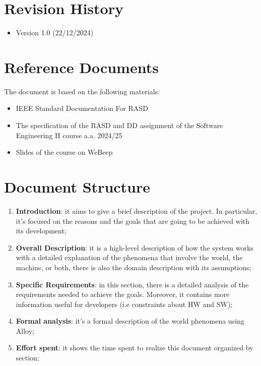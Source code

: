   
\section{Revision History}

\begin{itemize}
    \item Version 1.0 (22/12/2024)
\end{itemize}

\section{Reference Documents}

The document is based on the following materials:

\begin{itemize}
    \item IEEE Standard Documentation For RASD
    \item The specification of the RASD and DD assignment of the Software Engineering II course a.a. 2024/25 
    \item Slides of the course on WeBeep
\end{itemize}

\pagebreak
\section{Document Structure}

\begin{enumerate}
    \item  \textbf{Introduction}: it aims to give a brief description of the project. In particular, it’s focused on the reasons and the goals that are going to be achieved with its development;
 
    \item \textbf{Overall Description}: it is a high-level description of how the system works with a detailed explanation of the phenomena that involve the world, the machine, or both, there is also the domain description with its assumptions;
 
    \item \textbf{Specific Requirements}: in this section, there is a detailed analysis of the requirements needed to achieve the goals. Moreover, it contains more information useful for developers (i.e constraints about HW and SW);
    
    \item \textbf{Formal analysis}: it’s a formal description of the world phenomena using Alloy;

    \item  \textbf{Effort spent}: it shows the time spent to realize this document organized by section;
    
\end{enumerate}